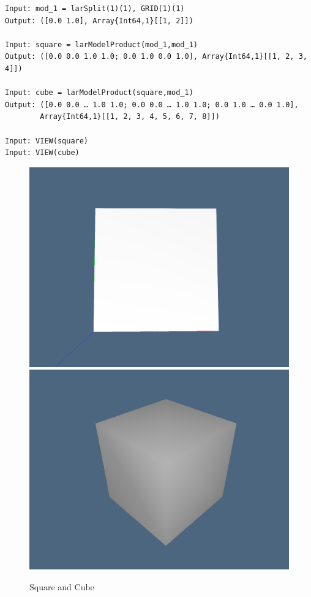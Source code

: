 \documentclass{article}
\begin{document}
\begin{flushleft} \small
\begin{list}{}{} \item
 \begin{Verbatim}[tabsize=4]
Input: mod_1 = larSplit(1)(1), GRID(1)(1)
Output: ([0.0 1.0], Array{Int64,1}[[1, 2]])

Input: square = larModelProduct(mod_1,mod_1)
Output: ([0.0 0.0 1.0 1.0; 0.0 1.0 0.0 1.0], Array{Int64,1}[[1, 2, 3, 4]])

Input: cube = larModelProduct(square,mod_1)
Output: ([0.0 0.0 … 1.0 1.0; 0.0 0.0 … 1.0 1.0; 0.0 1.0 … 0.0 1.0],
        Array{Int64,1}[[1, 2, 3, 4, 5, 6, 7, 8]])

Input: VIEW(square) 
Input: VIEW(cube) 
   \end{Verbatim}
\end{list}
\end{flushleft}

\begin{figure}[h!]
\centering
\includegraphics[scale=0.5]{quadrato.jpg}
\includegraphics[scale=0.5]{cubo.jpg}
\caption{Square and Cube}
\end{figure}
\newpage
\end{document}
